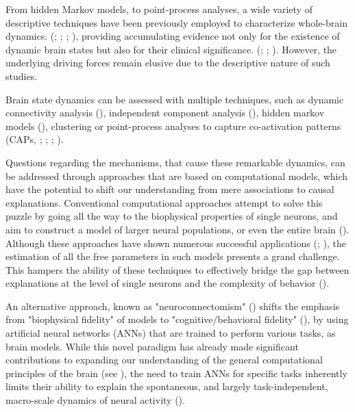 \documentclass{article}
\begin{document}
From hidden Markov models, to point-process analyses, a wide variety of descriptive techniques have been previously
employed to characterize whole-brain dynamics. (\href{https://doi.org/10.1073/pnas.1121329109}{};
\href{https://doi.org/10.1073/pnas.1705120114}{}; \href{https://doi.org/10.1073/pnas.1216856110}{}; \href{https://doi.org/10.1089/brain.2018.0586}{}),
providing accumulating evidence not only for the existence of dynamic brain states but also for their clinical
significance. (\href{https://doi.org/10.1016/j.neuroimage.2013.05.079}{}; \href{https://doi.org/10.1073/pnas.1418031112}{};
\href{https://doi.org/10.1038/s41467-020-18717-w}{}).
However, the underlying driving forces remain elusive due to the descriptive nature of such studies.

Brain state dynamics can be assessed with multiple techniques, such as dynamic connectivity analysis (), independent
component analysis (\href{https://doi.org/10.1073/pnas.1121329109}{}), hidden markov models
(\href{https://doi.org/10.1073/pnas.1705120114}{}), clustering \href{https://doi.org/10.1089/brain.2018.0586}{} or point-process analyses to
capture co-activation patterns (CAPs, \href{https://doi.org/10.1073/pnas.1216856110}{};
\href{https://doi.org/10.1016/j.neuroimage.2015.01.057}{}; \href{https://doi.org/10.3389/fnsys.2013.00101}{};
\href{https://doi.org/10.1038/s41467-020-18717-w}{}).

Questions regarding the mechanisms, that cause these remarkable dynamics, can be addressed through approaches that are
based on computational models, which have the potential to shift our understanding from mere associations to causal
explanations.
Conventional computational approaches attempt to solve this puzzle by going all the way to the biophysical properties
of single neurons, and aim to construct a model of larger neural populations, or even the entire brain
(\href{https://doi.org/10.1038/nn.4497}{}).
Although these approaches have shown numerous successful applications  (\href{https://doi.org/10.1038/s41593-018-0210-5}{};
\href{https://doi.org/10.1093/schbul/sby154}{}), the estimation of all the free parameters in such models presents a grand
challenge.
This hampers the ability of these techniques to effectively bridge the gap between explanations at the level of single
neurons and the complexity of behavior (\href{https://doi.org/10.1038/nn.4497}{}).

An alternative approach, known as "neuroconnectomism" (\href{https://doi.org/10.1038/s41583-023-00705-w}{}) shifts the
emphasis from "biophysical fidelity" of models to "cognitive/behavioral fidelity"
(\href{https://doi.org/10.1038/s41593-018-0210-5}{}), by using artificial neural networks (ANNs) that are trained to
perform various tasks, as brain models.
While this novel paradigm has already made significant contributions to expanding our understanding of the general
computational principles of the brain (see \href{https://doi.org/10.1038/s41583-023-00705-w}{}), the need to train ANNs for
specific tasks inherently limits their ability to explain the spontaneous, and largely task-independent, macro-scale
dynamics of neural activity  (\href{https://doi.org/10.1038/s41593-019-0520-2}{}).
\end{document}

